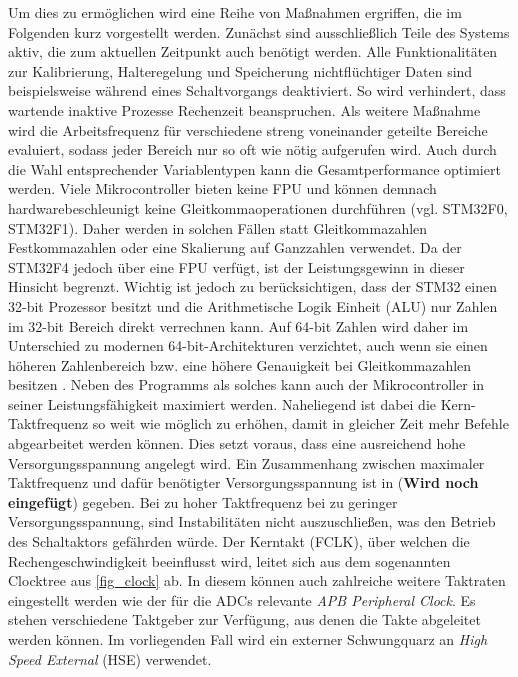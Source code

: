 Um dies zu ermöglichen wird eine Reihe von Maßnahmen ergriffen, die im Folgenden kurz vorgestellt werden.
Zunächst sind ausschließlich Teile des Systems aktiv, die zum aktuellen Zeitpunkt auch benötigt werden. Alle Funktionalitäten zur Kalibrierung, Halteregelung und Speicherung nichtflüchtiger Daten sind beispielsweise während eines Schaltvorgangs deaktiviert. So wird verhindert, dass wartende inaktive Prozesse Rechenzeit beanspruchen.
Als weitere Maßnahme wird die Arbeitsfrequenz für verschiedene streng voneinander geteilte Bereiche evaluiert, sodass jeder Bereich nur so oft wie nötig aufgerufen wird.
Auch durch die Wahl entsprechender Variablentypen kann die Gesamtperformance optimiert werden. Viele Mikrocontroller bieten keine FPU und können demnach hardwarebeschleunigt keine Gleitkommaoperationen durchführen (vgl. STM32F0, STM32F1). Daher werden in solchen Fällen statt Gleitkommazahlen Festkommazahlen oder eine Skalierung auf Ganzzahlen verwendet. Da der STM32F4 jedoch über eine FPU verfügt, ist der Leistungsgewinn in dieser Hinsicht begrenzt. Wichtig ist jedoch zu berücksichtigen, dass der STM32 einen 32-bit Prozessor besitzt und die Arithmetische Logik Einheit (ALU) nur Zahlen im 32-bit Bereich direkt verrechnen kann. Auf 64-bit Zahlen wird daher im Unterschied zu modernen 64-bit-Architekturen verzichtet, auch wenn sie einen höheren Zahlenbereich bzw. eine höhere Genauigkeit bei Gleitkommazahlen besitzen \cite{stm32}.
Neben des Programms als solches kann auch der Mikrocontroller in seiner Leistungsfähigkeit maximiert werden. Naheliegend ist dabei die Kern-Taktfrequenz so weit wie möglich zu erhöhen, damit in gleicher Zeit mehr Befehle abgearbeitet werden können. Dies setzt voraus, dass eine ausreichend hohe Versorgungsspannung angelegt wird. Ein Zusammenhang zwischen maximaler Taktfrequenz und dafür benötigter Versorgungsspannung ist in (\textbf{Wird noch eingefügt}) gegeben. Bei zu hoher Taktfrequenz bei zu geringer Versorgungsspannung, sind Instabilitäten nicht auszuschließen, was den Betrieb des Schaltaktors gefährden würde. Der Kerntakt (FCLK), über welchen die Rechengeschwindigkeit beeinflusst wird, leitet sich aus dem sogenannten Clocktree aus \autoref{fig_clock} ab. In diesem können auch zahlreiche weitere Taktraten eingestellt werden wie der für die ADCs relevante \textit{APB Peripheral Clock}. Es stehen verschiedene Taktgeber zur Verfügung, aus denen die Takte abgeleitet werden können. Im vorliegenden Fall wird ein externer Schwungquarz an \textit{High Speed External} (HSE) verwendet. \cite{stmref} \\

